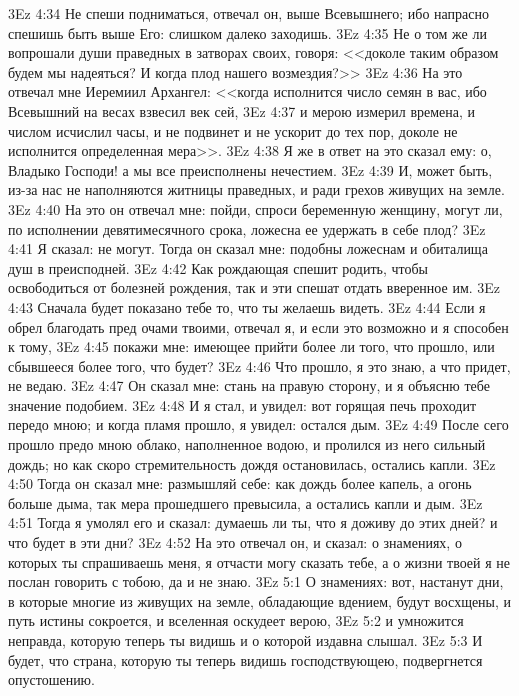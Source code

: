 \vs 3Ez 4:34 Не спеши подниматься, отвечал он, выше Всевышнего; ибо напрасно спешишь быть выше Его: слишком далеко заходишь.
\vs 3Ez 4:35 Не о том же ли вопрошали души праведных в затворах своих, говоря: <<доколе таким образом будем мы надеяться? И когда плод нашего возмездия?>>
\vs 3Ez 4:36 На это отвечал мне Иеремиил Архангел: <<когда исполнится число семян в вас, ибо Всевышний на весах взвесил век сей,
\vs 3Ez 4:37 и мерою измерил времена, и числом исчислил часы, и не подвинет и не ускорит до тех пор, доколе не исполнится определенная мера>>.
\vs 3Ez 4:38 Я же в ответ на это сказал ему: о, Владыко Господи! а мы все преисполнены нечестием.
\vs 3Ez 4:39 И, может быть, из-за нас не наполняются житницы праведных, и ради грехов живущих на земле.
\vs 3Ez 4:40 На это он отвечал мне: пойди, спроси беременную женщину, могут ли, по исполнении девятимесячного срока, ложесна ее удержать в себе плод?
\vs 3Ez 4:41 Я сказал: не могут. Тогда он сказал мне: подобны ложеснам и обиталища душ в преисподней.
\vs 3Ez 4:42 Как рождающая спешит родить, чтобы освободиться от болезней рождения, так и эти спешат отдать вверенное им.
\vs 3Ez 4:43 Сначала будет показано тебе то, что ты желаешь видеть.
\vs 3Ez 4:44 Если я обрел благодать пред очами твоими, отвечал я, и если это возможно и я способен к тому,
\vs 3Ez 4:45 покажи мне: имеющее прийти более ли того, что прошло, или сбывшееся более того, что будет?
\vs 3Ez 4:46 Что прошло, я это знаю, а что придет, не ведаю.
\vs 3Ez 4:47 Он сказал мне: стань на правую сторону, и я объясню тебе значение подобием.
\vs 3Ez 4:48 И я стал, и увидел: вот горящая печь проходит передо мною; и когда пламя прошло, я увидел: остался дым.
\vs 3Ez 4:49 После сего прошло предо мною облако, наполненное водою, и пролился из него сильный дождь; но как скоро стремительность дождя остановилась, остались капли.
\vs 3Ez 4:50 Тогда он сказал мне: размышляй себе: как дождь более капель, а огонь больше дыма, так мера прошедшего превысила, а остались капли и дым.
\vs 3Ez 4:51 Тогда я умолял его и сказал: думаешь ли ты, что я доживу до этих дней? и что будет в эти дни?
\vs 3Ez 4:52 На это отвечал он, и сказал: о знамениях, о которых ты спрашиваешь меня, я отчасти могу сказать тебе, а о жизни твоей я не послан говорить с тобою, да и не знаю.
\vs 3Ez 5:1 О знамениях: вот, настанут дни, в которые многие из живущих на земле, обладающие вдением, будут вос\-х\-ще\-ны, и путь истины сокроется, и вселенная оскудеет верою,
\vs 3Ez 5:2 и умножится неправда, которую теперь ты видишь и о которой издавна слышал.
\vs 3Ez 5:3 И будет, что страна, которую ты теперь видишь господствующею, подвергнется опустошению.
